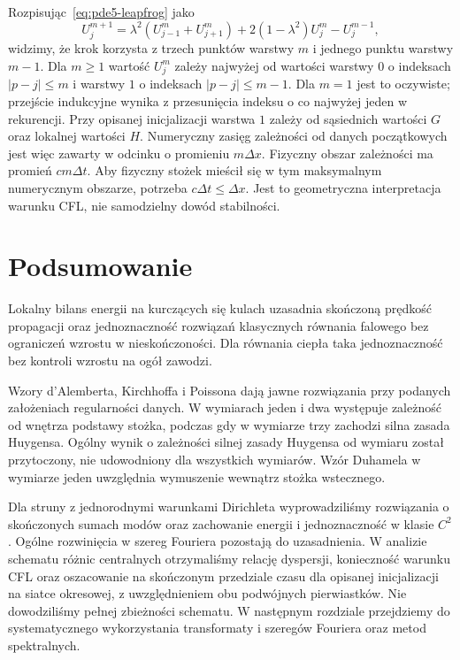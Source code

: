\begin{uwaga}
Rozpisując~\eqref{eq:pde5-leapfrog} jako
\[
 U_j^{m+1}=
 \lambda^2(U_{j-1}^m+U_{j+1}^m)
 +2(1-\lambda^2)U_j^m-U_j^{m-1},
\]
widzimy, że krok korzysta z trzech punktów
warstwy $m$ i jednego punktu warstwy $m-1$.
Dla $m\geq1$ wartość $U_j^m$ zależy najwyżej
od wartości warstwy $0$ o indeksach
$|p-j|\leq m$ i warstwy $1$ o indeksach
$|p-j|\leq m-1$. Dla $m=1$ jest to oczywiste;
przejście indukcyjne wynika z przesunięcia
indeksu o co najwyżej jeden w rekurencji.
Przy opisanej inicjalizacji warstwa $1$
zależy od sąsiednich wartości $G$ oraz
lokalnej wartości $H$.
Numeryczny zasięg zależności od danych
początkowych jest więc zawarty w odcinku
o promieniu $m\Delta x$.
Fizyczny obszar zależności ma promień
$c m\Delta t$. Aby fizyczny stożek mieścił się
w tym maksymalnym numerycznym obszarze,
potrzeba $c\Delta t\leq\Delta x$.
Jest to geometryczna interpretacja warunku CFL,
nie samodzielny dowód stabilności.
\end{uwaga}

\section{Podsumowanie}
\label{sec:pde5-summary}

Lokalny bilans energii na kurczących się kulach
uzasadnia skończoną prędkość propagacji oraz
jednoznaczność rozwiązań klasycznych równania
falowego bez ograniczeń wzrostu w nieskończoności.
Dla równania ciepła taka jednoznaczność
bez kontroli wzrostu na ogół zawodzi.

Wzory d'Alemberta, Kirchhoffa i Poissona
dają jawne rozwiązania przy podanych założeniach
regularności danych. W wymiarach jeden i dwa
występuje zależność od wnętrza podstawy
stożka, podczas gdy w wymiarze trzy zachodzi
silna zasada Huygensa. Ogólny wynik o zależności
silnej zasady Huygensa od wymiaru został
przytoczony, nie udowodniony dla wszystkich
wymiarów. Wzór Duhamela w wymiarze jeden
uwzględnia wymuszenie wewnątrz stożka wstecznego.

Dla struny z jednorodnymi warunkami Dirichleta
wyprowadziliśmy rozwiązania o skończonych
sumach modów oraz zachowanie energii
i jednoznaczność w klasie $C^2$.
Ogólne rozwinięcia w szereg Fouriera
pozostają do uzasadnienia.
W analizie schematu różnic centralnych
otrzymaliśmy relację dyspersji, konieczność
warunku CFL oraz oszacowanie na skończonym
przedziale czasu dla opisanej inicjalizacji
na siatce okresowej, z uwzględnieniem obu
podwójnych pierwiastków. Nie dowodziliśmy
pełnej zbieżności schematu.
W następnym rozdziale przejdziemy do
systematycznego wykorzystania transformaty
i szeregów Fouriera oraz metod spektralnych.

